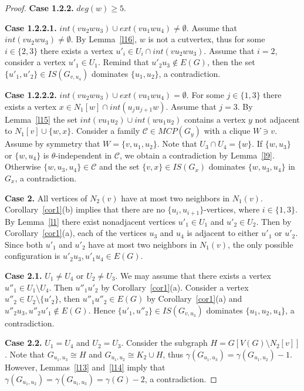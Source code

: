 \documentclass[12pt]{article}
\begin{document}
\begin{proof}
\textbf{Case 1.2.2.} $deg(w) \geq 5$. 

\textbf{Case 1.2.2.1.}
$int(vu_2wu_3) \cup ext(vu_1wu_4) \neq \emptyset$. Assume that $int(vu_2wu_3) \neq \emptyset$. By Lemma~\ref{l16}, $w$ is not a cutvertex, thus for some $i \in \{2,3\}$ there exists a vertex $u'_i \in U_i \cap int(vu_2wu_3)$. Assume that $i = 2$, consider  a vertex $u'_1 \in U_1$. Remind that $u'_2u_3 \notin E(G)$, then the set $\{u'_1,u'_2\} \in IS(G_{v,u_4})$ dominates $\{u_1,u_2\}$, a contradiction. 
 
\textbf{Case 1.2.2.2.} $int(vu_2wu_3) \cup ext(vu_1wu_4) = \emptyset$. For some $j \in \{1,3\}$ there exists a vertex $x \in N_1[w] \cap int(u_ju_{j+1}w)$. Assume that $j = 3$. By Lemma~\ref{l15} the set $int(vu_1u_2) \cup int(wu_1u_2)$ contains a vertex $y$ not adjacent to $N_1[v] \cup \{w,x\}$. Consider a family $\mathcal{C} \in MCP(G_y)$ with a clique $W \ni v$. Assume by symmetry that $W = \{v,u_1,u_2\}$. Note that $U_3 \cap U_4 = \{w\}$. If $\{w,u_3\}$ or $\{w,u_4\}$ is $\theta$-independent in $\mathcal{C}$, we obtain a contradiction by Lemma~\ref{l9}. Otherwise  $\{w,u_3,u_4\} \in \mathcal{C}$ and the set $\{v,x\} \in IS(G_x)$ dominates $\{w,u_3,u_4\}$ in $G_x$, a contradiction. 

\textbf{Case 2.} All vertices of $N_2(v)$ have at most two neighbors in $N_1(v)$. Corollary~\ref{cor1}(b) implies that there are no $\{u_i,u_{i+1}\}$-vertices, where $i \in \{1,3\}$. By Lemma~\ref{l1} there exist nonadjacent vertices $u'_1 \in U_1$ and $u'_2 \in U_2$. Then by Corollary~\ref{cor1}(a), each of the vertices $u_3$ and $u_4$ is adjacent to either $u'_1$ or $u'_2$. Since both $u'_1$ and $u'_2$ have at most two neighbors in $N_1(v)$, the only possible configuration is $u'_2u_3, u'_1u_4 \in E(G)$.

\textbf{Case 2.1.} $U_1 \neq U_4$ or $U_2 \neq U_3$. We may assume that there exists a vertex $u''_1 \in U_1 \setminus U_4$. Then $u''_1u'_2$ by Corollary~\ref{cor1}(a). Consider a vertex $u''_2 \in U_2 \setminus \{u'_2\}$, then $u''_1u''_2 \in E(G)$ by Corollary~\ref{cor1}(a) and $u''_2u_3, u''_2u'_1 \notin E(G)$. Hence $\{u'_1,u''_2\} \in IS(G_{v,u_3})$ dominates $\{u_1,u_2,u_4\}$, a contradiction.

\textbf{Case 2.2.} $U_1 = U_4$ and $U_2 = U_3$. Consider the subgraph $H = G[V(G) \setminus N_2[v]]$. Note that $G_{u_1,u_3} \cong H$ and $G_{u_1,u_2} \cong K_2 \cup H$, thus $\gamma(G_{u_1,u_3}) = \gamma(G_{u_1,u_2}) - 1$.  However, Lemmas~\ref{l13} and~\ref{l14} imply that $\gamma(G_{u_1,u_2}) = \gamma(G_{u_1,u_3}) = \gamma(G) - 2$, a contradiction. 
\end{proof}
\end{document}
